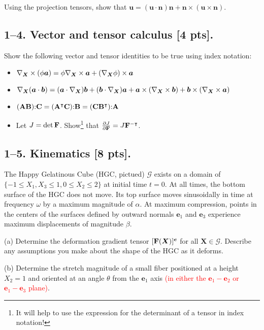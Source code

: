 Using the projection tensors, show that $\bm{u} = (\bm{u} \cdot \bm{n}) \bm{n} + \bm{n} \times (\bm{u} \times \bm{n} )$.

\bigskip
\subsection*{1--4. \textbf{Vector and tensor calculus} [4 pts].} Show the following vector and tensor identities to be true using index notation:

\begin{itemize}
    \item $\nabla_{\bm{X}} \times (\phi \bm{a}) = \phi \nabla_{\bm{X}} \times \bm{a} + (\nabla_{\bm{X}}\phi) \times \bm{a}$
    \item $\nabla_{\bm{X}} (\bm{a} \cdot \bm{b}) = (\bm{a} \cdot \nabla_{\bm{X}}) \bm{b} + (\bm{b} \cdot \nabla_{\bm{X}}) \bm{a} + \bm{a} \times (\nabla_{\bm{X}} \times \bm{b}) + \bm{b} \times (\nabla_{\bm{X}} \times \bm{a})$
    \item $ (\mathbf{A} \mathbf{B}) \mathbf{:} \mathbf{C} = (\mathbf{A}^\intercal \mathbf{C})\mathbf{:} \mathbf{B} = (\mathbf{C} \mathbf{B}^\intercal)\mathbf{:} \mathbf{A}$
    \item Let $J = \det \mathbf{F}$. Show\footnote{It will help to use the expression for the determinant of a tensor in index notation!} that $\frac{\partial J}{\partial \mathbf{F}} = J \mathbf{F}^{-\intercal}$. 
    \end{itemize}

\bigskip
\subsection*{1--5. \textbf{Kinematics} [8 pts].} The Happy Gelatinous Cube (HGC, pictued) $\mathcal{G}$ exists on a domain of $\{-1\leq X_1 , X_3\leq1, 0\leq X_2 \leq 2\}$ at initial time $t=0$. 
At all times, the bottom surface of the HGC does not move. 
Its top surface moves sinusoidally in time at frequency $\omega$ by a maximum magnitude of $\alpha$. 
At maximum compression, points in the centers of the surfaces defined by outward normals $\bm{e}_1$ and $\bm{e}_3$ experience maximum displacements of magnitude $\beta$. 

\medskip
(a) Determine the deformation gradient tensor $[\mathbf{F}(\bm{X})]^{\bm{e}}$ for all $\bm{X}\in \mathcal{G}$. 
Describe any assumptions you make about the shape of the HGC as it deforms. 

\medskip
(b) Determine the stretch magnitude of a small fiber positioned at a height $X_2 = 1$ and oriented at an angle $\theta$ from the $\bm{e}_1$ axis \textcolor{red}{(in either the $\bm{e}_1- \bm{e}_2$ or $\bm{e}_1- \bm{e}_3$ plane)}. 

